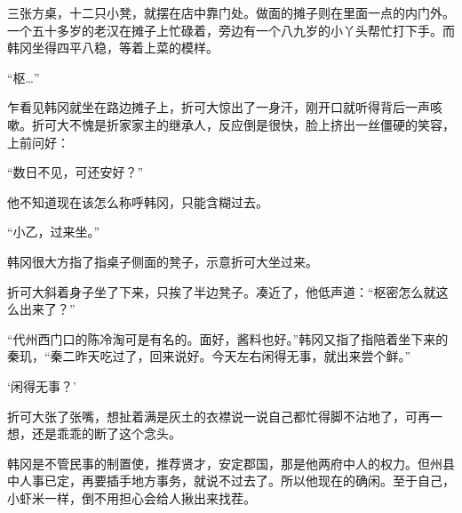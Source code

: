 三张方桌，十二只小凳，就摆在店中靠门处。做面的摊子则在里面一点的内门外。一个五十多岁的老汉在摊子上忙碌着，旁边有一个八九岁的小丫头帮忙打下手。而韩冈坐得四平八稳，等着上菜的模样。

“枢…”

乍看见韩冈就坐在路边摊子上，折可大惊出了一身汗，刚开口就听得背后一声咳嗽。折可大不愧是折家家主的继承人，反应倒是很快，脸上挤出一丝僵硬的笑容，上前问好：

“数日不见，可还安好？”

他不知道现在该怎么称呼韩冈，只能含糊过去。

“小乙，过来坐。”

韩冈很大方指了指桌子侧面的凳子，示意折可大坐过来。

折可大斜着身子坐了下来，只挨了半边凳子。凑近了，他低声道：“枢密怎么就这么出来了？”

“代州西门口的陈冷淘可是有名的。面好，酱料也好。”韩冈又指了指陪着坐下来的秦玑，“秦二昨天吃过了，回来说好。今天左右闲得无事，就出来尝个鲜。”

‘闲得无事？’

折可大张了张嘴，想扯着满是灰土的衣襟说一说自己都忙得脚不沾地了，可再一想，还是乖乖的断了这个念头。

韩冈是不管民事的制置使，推荐贤才，安定郡国，那是他两府中人的权力。但州县中人事已定，再要插手地方事务，就说不过去了。所以他现在的确闲。至于自己，小虾米一样，倒不用担心会给人揪出来找茬。
